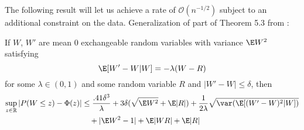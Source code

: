 The following result will let us achieve a rate of $\mathcal{O}(n^{-1/2})$ subject to an
additional constraint on the data.  Generalization of part of Theorem 5.3 from \cite{chen2010normal}:
\begin{theorem}
  \label{T:better-rate}
  If $W$, $W'$ are mean 0 exchangeable random variables with variance
  $\E W^2$
  satisfying
  \begin{equation*}
    \E[W'-W|W] = -\lambda(W-R)
  \end{equation*}
  for some $\lambda \in (0,1)$ and some random variable $R$ and $|W'-W| \leq \delta$, then
  \begin{equation*}
    \begin{split}
      \sup_{z \in \mathbb{R}} |P(W \leq z) - \Phi(z)|
      &\leq \frac{.41 \delta^3}{\lambda} + 3 \delta (\sqrt{\E W^2} + \E |R|)
      + \frac{1}{2\lambda} \sqrt{\var (\E [(W'-W)^2|W])} \\
      &\quad + |\E W^2 - 1| + \E |WR| + \E |R|
    \end{split}
  \end{equation*}
\end{theorem}
